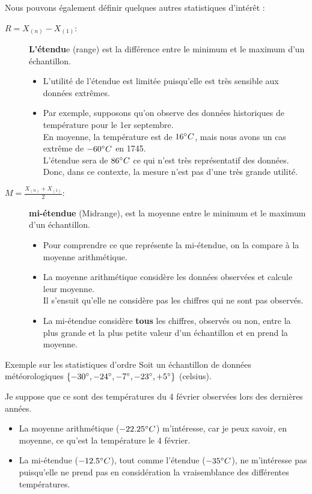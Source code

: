 \documentclass[10pt, french]{article}
\begin{document}
\begin{multicols*}{2}
Nous pouvons également définir quelques autres statistiques d'intérêt :

\begin{description}
	\item[$R = X_{(n)} - X_{(1)}$: ] \textbf{L'étendu}e (range) est la différence entre le minimum et le maximum d'un échantillon.
		\begin{itemize}[leftmargin = *]
		\item	L'utilité de l'étendue est limitée puisqu'elle est très sensible aux données extrêmes.
		\item	Par exemple, supposons qu’on observe des données historiques de température pour le 1er septembre. \\
				En moyenne, la température est de $16\degree C$, mais nous avons un cas extrême de $-60\degree C$ en 1745.\\
				L'étendue sera de $86\degree C$ ce qui n'est très représentatif des données.\\
				Donc, dans ce contexte, la mesure n'est pas d'une très grande utilité.
		\end{itemize}
	\item[$M = \frac{X_{(n)} + X_{(1)}}{2}$: ] \textbf{mi-étendue} (Midrange), est la moyenne entre le minimum et le maximum d'un échantillon.
		\begin{itemize}[leftmargin = *]
		\item	Pour comprendre ce que représente la mi-étendue, on la compare à la moyenne arithmétique.
		\item	La moyenne arithmétique considère les données observées et calcule leur moyenne.\\
				Il s'ensuit qu'elle ne considère pas les chiffres qui ne sont pas observés.
		\item	La mi-étendue considère \textbf{tous} les chiffres, observés ou non, entre la plus grande et la plus petite valeur d'un échantillon et en prend la moyenne.		
		\end{itemize}
\end{description}

\begin{conceptgen}{Exemple sur les statistiques d'ordre}
Soit un échantillon de données météorologiques $\{-30\degree, -24\degree, -7\degree, -23\degree, +5\degree\}$ (celsius).

Je suppose que ce sont des températures du 4 février observées lors des dernières années.
\begin{itemize}[leftmargin = *]
	\item	La moyenne arithmétique ($-22.25\degree C$) m'intéresse, car je peux savoir, en moyenne, ce qu'est la température le 4 février.
	\item	La mi-étendue ($-12.5\degree C$), tout comme l'étendue ($-35\degree C$), ne m'intéresse pas puisqu'elle ne prend pas en considération la vraisemblance des différentes températures.
\end{itemize}


\end{conceptgen}
\end{multicols*}
\end{document}
